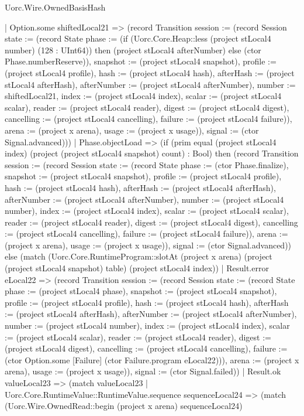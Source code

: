 \begin{lexlean}{Uorc.Wire.OwnedBasisHash}
\begin{semanticmodule}
{        | Option.some shiftedLocal21 => (record Transition {session := (record Session {state := (record State {phase := (if (Uorc.Core.Heap::less (project stLocal4 number) (128 : UInt64)) then (project stLocal4 afterNumber) else (ctor Phase.numberReserve)), snapshot := (project stLocal4 snapshot), profile := (project stLocal4 profile), hash := (project stLocal4 hash), afterHash := (project stLocal4 afterHash), afterNumber := (project stLocal4 afterNumber), number := shiftedLocal21, index := (project stLocal4 index), scalar := (project stLocal4 scalar), reader := (project stLocal4 reader), digest := (project stLocal4 digest), cancelling := (project stLocal4 cancelling), failure := (project stLocal4 failure)}), arena := (project x arena), usage := (project x usage)}), signal := (ctor Signal.advanced)}))
      | Phase.objectLoad => (if (prim equal (project stLocal4 index) (project (project stLocal4 snapshot) count) : Bool) then (record Transition {session := (record Session {state := (record State {phase := (ctor Phase.finalize), snapshot := (project stLocal4 snapshot), profile := (project stLocal4 profile), hash := (project stLocal4 hash), afterHash := (project stLocal4 afterHash), afterNumber := (project stLocal4 afterNumber), number := (project stLocal4 number), index := (project stLocal4 index), scalar := (project stLocal4 scalar), reader := (project stLocal4 reader), digest := (project stLocal4 digest), cancelling := (project stLocal4 cancelling), failure := (project stLocal4 failure)}), arena := (project x arena), usage := (project x usage)}), signal := (ctor Signal.advanced)}) else (match (Uorc.Core.RuntimeProgram::slotAt (project x arena) (project (project stLocal4 snapshot) table) (project stLocal4 index))
        | Result.error eLocal22 => (record Transition {session := (record Session {state := (record State {phase := (project stLocal4 phase), snapshot := (project stLocal4 snapshot), profile := (project stLocal4 profile), hash := (project stLocal4 hash), afterHash := (project stLocal4 afterHash), afterNumber := (project stLocal4 afterNumber), number := (project stLocal4 number), index := (project stLocal4 index), scalar := (project stLocal4 scalar), reader := (project stLocal4 reader), digest := (project stLocal4 digest), cancelling := (project stLocal4 cancelling), failure := (ctor Option.some [Failure] (ctor Failure.program eLocal22))}), arena := (project x arena), usage := (project x usage)}), signal := (ctor Signal.failed)})
        | Result.ok valueLocal23 => (match valueLocal23
          | Uorc.Core.RuntimeValue::RuntimeValue.sequence sequenceLocal24 => (match (Uorc.Wire.OwnedRead::begin (project x arena) sequenceLocal24)
}
\end{semanticmodule}
\end{lexlean}
